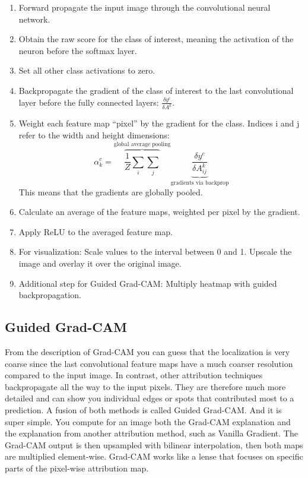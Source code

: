 \documentclass[12pt,]{krantz}
\providecommand{\tightlist}{%
  \setlength{\itemsep}{0pt}\setlength{\parskip}{0pt}}
\begin{document}
\begin{enumerate}
\def\labelenumi{\arabic{enumi}.}
\tightlist
\item
  Forward propagate the input image through the convolutional neural
  network.
\item
  Obtain the raw score for the class of interest, meaning the activation
  of the neuron before the softmax layer.
\item
  Set all other class activations to zero.
\item
  Backpropagate the gradient of the class of interest to the last
  convolutional layer before the fully connected layers:
  \(\frac{\delta{}y^c}{\delta{}A^k}\).
\item
  Weight each feature map ``pixel'' by the gradient for the class.
  Indices i and j refer to the width and height dimensions:
  \[\alpha_k^c = \overbrace{\frac{1}{Z}\sum_{i}\sum_{j}}^{\text{global average pooling}} \underbrace{\frac{\delta y^c}{\delta A_{ij}^k}}_{\text{gradients via backprop}}\]
  This means that the gradients are globally pooled.
\item
  Calculate an average of the feature maps, weighted per pixel by the
  gradient.
\item
  Apply ReLU to the averaged feature map.
\item
  For visualization: Scale values to the interval between 0 and 1.
  Upscale the image and overlay it over the original image.
\item
  Additional step for Guided Grad-CAM: Multiply heatmap with guided
  backpropagation.
\end{enumerate}

\subsection{Guided Grad-CAM}\label{guided-grad-cam}

From the description of Grad-CAM you can guess that the localization is
very coarse since the last convolutional feature maps have a much
coarser resolution compared to the input image. In contrast, other
attribution techniques backpropagate all the way to the input pixels.
They are therefore much more detailed and can show you individual edges
or spots that contributed most to a prediction. A fusion of both methods
is called Guided Grad-CAM. And it is super simple. You compute for an
image both the Grad-CAM explanation and the explanation from another
attribution method, such as Vanilla Gradient. The Grad-CAM output is
then upsampled with bilinear interpolation, then both maps are
multiplied element-wise. Grad-CAM works like a lense that focuses on
specific parts of the pixel-wise attribution map.
\end{document}
